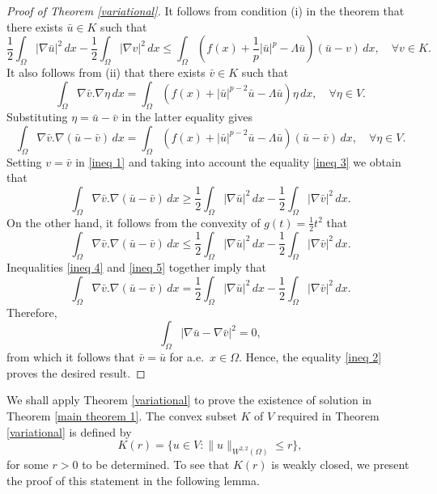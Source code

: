 \documentclass[10pt,a4paper]{amsart}
\numberwithin{equation}{section}
\begin{document}
\begin{proof}[Proof of Theorem \ref{variational}]
It follows from condition (i) in the theorem that there exists \(\bar{u} \in K\)
such that
\begin{equation}\label{ineq 1}
    \frac{1}{2}\int_{\Omega} |\nabla \bar{u}|^2\,dx
    -\frac{1}{2}\int_{\Omega} |\nabla v|^2\,dx
    \leq \int_\Omega (   f(x)+\frac{1}{p}|\bar{u}|^{p}- \Lambda \bar{u}) (\bar{u}-v)\,dx ,
    \quad \forall v\in  K.
\end{equation}
It also follows from (ii) that there exists \(\bar{v} \in K\) such that
\begin{equation}\label{ineq 2}
\int_\Omega\nabla\bar{v}.\nabla\eta\,dx=\int_\Omega (f(x)
+|\bar{u}|^{p-2}\bar{u} - \Lambda \bar{u})\eta\,dx,\quad \forall\eta\in V.
\end{equation}
Substituting \(\eta = \bar{u} - \bar{v}\) in the latter equality gives
\begin{equation}\label{ineq 3}
\int_\Omega\nabla\bar{v}.\nabla(\bar{u} - \bar{v})\,dx
=\int_\Omega (f(x)  +|\bar{u}|^{p-2}\bar{u} - \Lambda \bar{u})(\bar{u}
- \bar{v})\,dx,\quad \forall\eta\in V.
\end{equation}
Setting \(v = \bar{v}\) in \eqref{ineq 1} and taking into account the equality
\eqref{ineq 3} we obtain that
\begin{equation}\label{ineq 4}
 \int_\Omega\nabla\bar{v}.\nabla(\bar{u} - \bar{v})\,dx
 \geq\frac{1}{2}\int_{\Omega} |\nabla \bar{u}|^2\,dx
 -\frac{1}{2}\int_{\Omega} |\nabla \bar{v}|^2\,dx.
\end{equation}
On the other hand, it follows from the convexity of \( g(t)=\frac{1}{2}t^2\) that
\begin{equation}\label{ineq 5}
    \int_\Omega\nabla\bar{v}.\nabla(\bar{u} - \bar{v})\,dx \leq\frac{1}{2}\int_{\Omega} |\nabla \bar{u}|^2\,dx -\frac{1}{2}\int_{\Omega} |\nabla \bar{v}|^2\,dx.
\end{equation}
Inequalities \eqref{ineq 4} and \eqref{ineq 5} together imply that
\[
\int_\Omega\nabla\bar{v}.\nabla(\bar{u} - \bar{v})\,dx
=\frac{1}{2}\int_{\Omega} |\nabla \bar{u}|^2\,dx-\frac{1}{2}\int_{\Omega}
|\nabla \bar{v}|^2\,dx.
\]
Therefore,
\[
\int_{\Omega} |\nabla \bar{u}-\nabla \bar{v}|^2=0,
\]
from which it follows that \(\bar{v}=\bar{u}\) for a.e.\
 \(x \in\Omega\). Hence, the equality \eqref{ineq 2} proves the desired  result.
\end{proof}

We shall apply Theorem \ref{variational} to prove the existence of solution  in
Theorem \ref{main theorem 1}.  The convex subset \(K\) of \(V\)
required in Theorem \ref{variational} is defined by
\begin{equation}\label{def K}
K(r)=\{u\in V: \rVert u \rVert_{ W^{2,2}(\Omega)}\leq r\},
\end{equation}
for some \(r > 0\) to be determined. To see that \(K(r)\) is weakly closed,
we present the proof of this statement in the following lemma.
\end{document}
